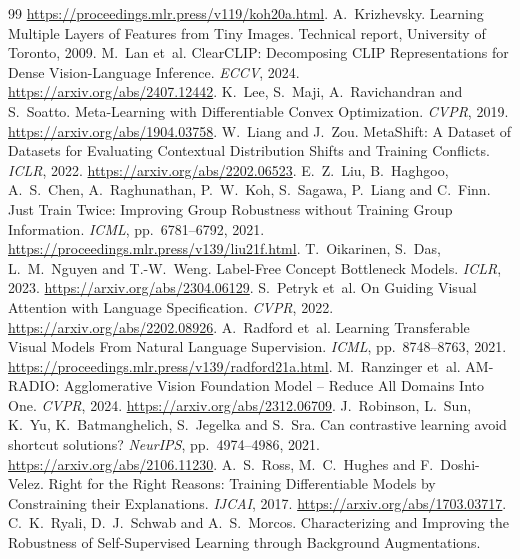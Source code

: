 \documentclass{article}
\begin{document}
\begin{thebibliography}{99}
\url{https://proceedings.mlr.press/v119/koh20a.html}.
A.~Krizhevsky.
Learning Multiple Layers of Features from Tiny Images. Technical report, University of Toronto, 2009.
M.~Lan et~al.
ClearCLIP: Decomposing CLIP Representations for Dense Vision-Language Inference.
\emph{ECCV}, 2024. \url{https://arxiv.org/abs/2407.12442}.
K.~Lee, S.~Maji, A.~Ravichandran and S.~Soatto.
Meta-Learning with Differentiable Convex Optimization. \emph{CVPR}, 2019.
\url{https://arxiv.org/abs/1904.03758}.
W.~Liang and J.~Zou.
MetaShift: A Dataset of Datasets for Evaluating Contextual Distribution Shifts and Training Conflicts.
\emph{ICLR}, 2022. \url{https://arxiv.org/abs/2202.06523}.
E.~Z.~Liu, B.~Haghgoo, A.~S.~Chen, A.~Raghunathan, P.~W.~Koh,
S.~Sagawa, P.~Liang and C.~Finn.
Just Train Twice: Improving Group Robustness without Training Group Information.
\emph{ICML}, pp.~6781--6792, 2021.
\url{https://proceedings.mlr.press/v139/liu21f.html}.
T.~Oikarinen, S.~Das, L.~M.~Nguyen and T.-W.~Weng.
Label-Free Concept Bottleneck Models. \emph{ICLR}, 2023.
\url{https://arxiv.org/abs/2304.06129}.
S.~Petryk et~al.
On Guiding Visual Attention with Language Specification. \emph{CVPR}, 2022.
\url{https://arxiv.org/abs/2202.08926}.
A.~Radford et~al.
Learning Transferable Visual Models From Natural Language Supervision.
\emph{ICML}, pp.~8748--8763, 2021.
\url{https://proceedings.mlr.press/v139/radford21a.html}.
M.~Ranzinger et~al.
AM-RADIO: Agglomerative Vision Foundation Model -- Reduce All Domains Into One.
\emph{CVPR}, 2024. \url{https://arxiv.org/abs/2312.06709}.
J.~Robinson, L.~Sun, K.~Yu, K.~Batmanghelich, S.~Jegelka and S.~Sra.
Can contrastive learning avoid shortcut solutions? \emph{NeurIPS}, pp.~4974--4986, 2021.
\url{https://arxiv.org/abs/2106.11230}.
A.~S.~Ross, M.~C.~Hughes and F.~Doshi-Velez.
Right for the Right Reasons: Training Differentiable Models by Constraining their Explanations.
\emph{IJCAI}, 2017. \url{https://arxiv.org/abs/1703.03717}.
C.~K.~Ryali, D.~J.~Schwab and A.~S.~Morcos.
Characterizing and Improving the Robustness of Self-Supervised Learning through Background Augmentations.

\end{thebibliography}
\end{document}
